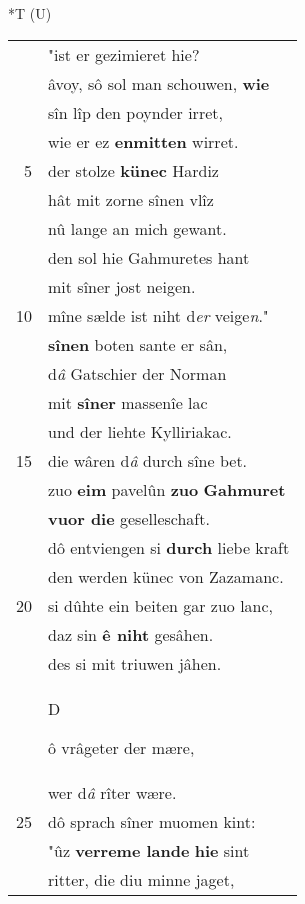 \documentclass[8pt,a4paper,notitlepage]{article}
\begin{document}
\begin{table}[ht]
\begin{minipage}[t]{0.5\linewidth}
\end{minipage}
\hspace{0.5cm}
\begin{minipage}[t]{0.5\linewidth}
\small
\begin{center}*T (U)
\end{center}
\begin{tabular}{rl}
 & "ist er gezimieret hie?\\ 
 & âvoy, sô sol man schouwen, \textbf{wie}\\ 
 & sîn lîp den poynder irret,\\ 
 & wie er ez \textbf{enmitten} wirret.\\ 
5 & der stolze \textbf{künec} Hardiz\\ 
 & hât mit zorne sînen vlîz\\ 
 & nû lange an mich gewant.\\ 
 & den sol hie Gahmuretes hant\\ 
 & mit sîner jost neigen.\\ 
10 & mîne sælde ist niht d\textit{er} veige\textit{n}."\\ 
 & \textbf{sînen} boten sante er sân,\\ 
 & d\textit{â} Gatschier der Norman\\ 
 & mit \textbf{sîner} massenîe lac\\ 
 & und der liehte Kylliriakac.\\ 
15 & die wâren d\textit{â} durch sîne bet.\\ 
 & zuo \textbf{eim} pavelûn \textbf{zuo} \textbf{Gahmuret}\\ 
 & \textbf{vuor \textbf{die}} geselleschaft.\\ 
 & dô entviengen si \textbf{durch} liebe kraft\\ 
 & den werden künec von Zazamanc.\\ 
20 & si dûhte ein beiten gar zuo lanc,\\ 
 & daz sin \textbf{ê niht} gesâhen.\\ 
 & des si mit triuwen jâhen.\\ 
 & \begin{large}D\end{large}ô vrâgeter der mære,\\ 
 & wer d\textit{â} rîter wære.\\ 
25 & dô sprach sîner muomen kint:\\ 
 & "ûz \textbf{verreme lande} \textbf{hie} sint\\ 
 & ritter, die diu minne jaget,\\ 

\end{tabular}
\end{minipage}
\end{table}
\end{document}
